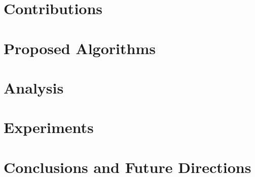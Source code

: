 \documentclass[letterpaper]{article} %
\begin{document}
\section{Contributions}
\label{contributions}


\section{Proposed Algorithms}
\label{algo}


\section{Analysis}
\label{analysis}


\section{Experiments}
\label{expt}




\section{Conclusions and Future Directions}
\label{conclusions}




\newpage



\appendix
\label{appendix}

\end{document}
